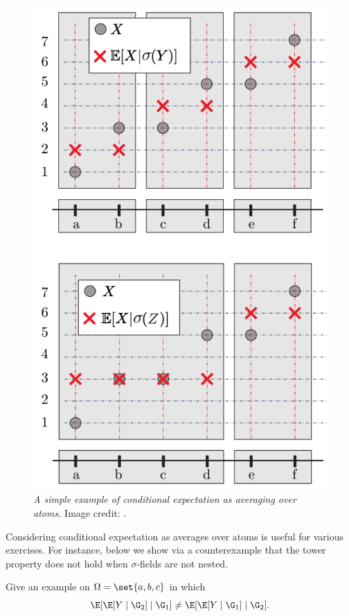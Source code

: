 \documentclass{article} %
\begin{document}
\begin{example}
\begin{figure}[H]
\centering
\includegraphics[width=.4\linewidth]{images/zitokovic_example_conditional_expectation_as_average_over_atoms}
\caption{ \textit{A simple example of conditional expectation as averaging over atoms.} Image credit: \cite{zitkovic2013lecture10}.}
\label{fig:zitkovic_example_conditional_expectation_as_averaging_over_atoms}	
\end{figure}
\label{ex:zitkovic_example_conditional_expectation_as_averaging_over_atoms}
\end{example}



Considering conditional expectation as averages over atoms is useful for various exercises. For instance, below we show via a counterexample that the tower property does not hold when $\sigma$-fields are not nested. 


\begin{exercise}
\cite[Exercise 5.1.6]{durrett2010probability} Give an example on $\Omega=\set{a,b,c}$ in which
\[ \E[\E[Y \mid \G_2] \mid \G_1]  \neq \E[\E[Y \mid \G_1] \mid \G_2]. \]
\end{exercise}
\end{document}
